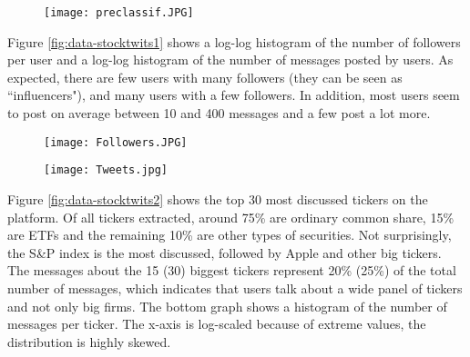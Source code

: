 \begin{figure*}[h]
\centering
        \begin{subfigure}[b]{0.75\textwidth}   
            \centering 
            \texttt{[image: preclassif.JPG]}
        \end{subfigure}
        \label{categrepartition-preclassif}
\end{figure*}



Figure \ref{fig:data-stocktwits1} shows a log-log histogram of the number of followers per user and a log-log histogram of the number of messages posted by users. As expected, there are few users with many followers (they can be seen as ``influencers"), and many users with a few followers. In addition, most users seem to post on average between 10 and 400 messages and a few post a lot more. 


\begin{figure*}[]
\centering
        \begin{subfigure}{0.75\textwidth}   
            \centering 
            \texttt{[image: Followers.JPG]}
        \end{subfigure}
        \quad
        \begin{subfigure}{0.75\textwidth}
            \centering
            \texttt{[image: Tweets.jpg]}
        \end{subfigure}

        \label{fig:data-stocktwits1}
\end{figure*}


Figure \ref{fig:data-stocktwits2} shows the top 30 most discussed tickers on the platform. Of all tickers extracted, around 75\% are ordinary common share, 15\% are ETFs and the remaining 10\% are other types of securities. Not surprisingly, the S\&P index is the most discussed, followed by Apple and other big tickers. The messages about the 15 (30) biggest tickers represent 20\% (25\%) of the total number of messages, which indicates that users talk about a wide panel of tickers and not only big firms. The bottom graph shows a histogram of the number of messages per ticker. The x-axis is log-scaled because of extreme values, the distribution is highly skewed. 

